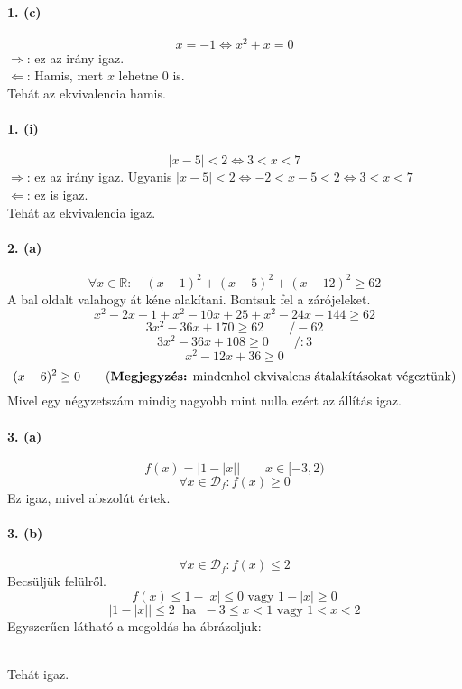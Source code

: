 \documentclass[12pt,a4paper,fleqn]{article}
\newcommand{\myparagraph}[1]{\paragraph{#1}\mbox{}}
\begin{document}
\myparagraph{1. (c)}
\[ x = -1 \iff x^2 + x = 0 \]
$\Rightarrow$: ez az irány igaz. \\
$\Leftarrow$: Hamis, mert $x$ lehetne $0$ is. \\
Tehát az ekvivalencia hamis.

\myparagraph{1. (i)}
\[ |x-5| < 2 \iff 3 < x < 7 \]
$\Rightarrow$: ez az irány igaz. Ugyanis $|x-5| < 2 \iff -2 < x-5 < 2
  \iff 3 < x < 7 $ \\
$\Leftarrow$: ez is igaz. \\
Tehát az ekvivalencia igaz.

\myparagraph{2. (a)}
\[ \forall x \in \mathbb{R}: \quad (x-1)^2+(x-5)^2+(x-12)^2 \geq 62 \]
A bal oldalt valahogy át kéne alakítani. Bontsuk fel a zárójeleket.
\[ x^2-2x+1+x^2-10x+25+x^2-24x+144 \geq 62 \]
\[ 3x^2 - 36x + 170 \geq 62 \qquad /-62 \]
\[ 3x^2 - 36x + 108 \geq 0  \qquad /:3  \]
\[  x^2 - 12x + 36  \geq 0 \]
\[ (x-6)^2 \geq 0 \qquad \text{(\textbf{Megjegyzés:} mindenhol ekvivalens
  átalakításokat végeztünk)}\]
Mivel egy négyzetszám mindig nagyobb mint nulla ezért az állítás igaz.

\myparagraph{3. (a)}
\[ f(x) = \big|1-|x|\big| \qquad x \in [-3, 2) \]
\[ \forall x \in \mathcal{D}_f: f(x) \geq 0 \]
Ez igaz, mivel abszolút értek.

\myparagraph{3. (b)}
\[ \forall x \in \mathcal{D}_f: f(x) \leq 2 \]
Becsüljük felülről.
\[ f(x) \leq 1-|x| \leq 0 \text{ vagy } 1 - |x| \geq 0 \]
\[ \big|1-|x|\big| \leq 2 \;\text{ ha }\; -3 \leq x < 1 \text{ vagy } 1 < x < 2 \]
Egyszerűen látható a megoldás ha ábrázoljuk: \\[1.2em]
\\ Tehát igaz.
\end{document}
